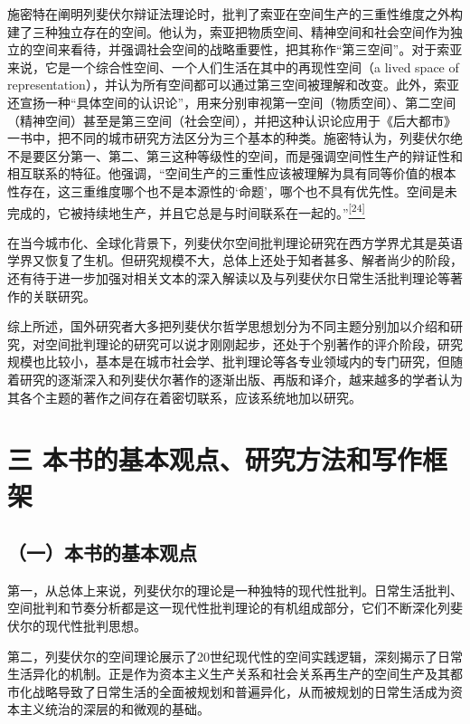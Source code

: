 \documentclass[UTF8, fontset = sourcesans, a4paper, oneside, zihao =
-4, scheme=chinese, no-math, space=true]{ctexbook}
\begin{document}
施密特在阐明列斐伏尔辩证法理论时，批判了索亚在空间生产的三重性维度之外构建了三种独立存在的空间。他认为，索亚把物质空间、精神空间和社会空间作为独立的空间来看待，并强调社会空间的战略重要性，把其称作``第三空间''。对于索亚来说，它是一个综合性空间、一个人们生活在其中的再现性空间（a
lived space of
representation），并认为所有空间都可以通过第三空间被理解和改变。此外，索亚还宣扬一种``具体空间的认识论''，用来分别审视第一空间（物质空间）、第二空间（精神空间）甚至是第三空间（社会空间），并把这种认识论应用于《后大都市》一书中，把不同的城市研究方法区分为三个基本的种类。施密特认为，列斐伏尔绝不是要区分第一、第二、第三这种等级性的空间，而是强调空间性生产的辩证性和相互联系的特征。他强调，``空间生产的三重性应该被理解为具有同等价值的根本性存在，这三重维度哪个也不是本源性的`命题'，哪个也不具有优先性。空间是未完成的，它被持续地生产，并且它总是与时间联系在一起的。''\protect\hypertarget{part0004.htmlux5cux23w24}{}{}\protect\hyperlink{part0004.htmlux5cux23m24}{\textsuperscript{{[}24{]}}}

在当今城市化、全球化背景下，列斐伏尔空间批判理论研究在西方学界尤其是英语学界又恢复了生机。但研究规模不大，总体上还处于知者甚多、解者尚少的阶段，还有待于进一步加强对相关文本的深入解读以及与列斐伏尔日常生活批判理论等著作的关联研究。

综上所述，国外研究者大多把列斐伏尔哲学思想划分为不同主题分别加以介绍和研究，对空间批判理论的研究可以说才刚刚起步，还处于个别著作的评介阶段，研究规模也比较小，基本是在城市社会学、批判理论等各专业领域内的专门研究，但随着研究的逐渐深入和列斐伏尔著作的逐渐出版、再版和译介，越来越多的学者认为其各个主题的著作之间存在着密切联系，应该系统地加以研究。

\section{三
本书的基本观点、研究方法和写作框架}\label{part0004.htmlux5cux23c003}

\subsection{（一）本书的基本观点}\label{part0004.htmlux5cux23d003}

第一，从总体上来说，列斐伏尔的理论是一种独特的现代性批判。日常生活批判、空间批判和节奏分析都是这一现代性批判理论的有机组成部分，它们不断深化列斐伏尔的现代性批判思想。

第二，列斐伏尔的空间理论展示了20世纪现代性的空间实践逻辑，深刻揭示了日常生活异化的机制。正是作为资本主义生产关系和社会关系再生产的空间生产及其都市化战略导致了日常生活的全面被规划和普遍异化，从而被规划的日常生活成为资本主义统治的深层的和微观的基础。
\end{document}

